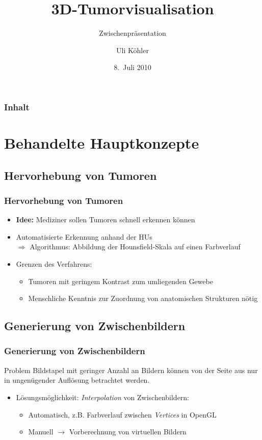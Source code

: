 \documentclass[14pt]{beamer}
\title{3D-Tumorvisualisation}
\subtitle{Zwischenpräsentation}
\author{Uli Köhler}
\institute[EMG]{Ernst-Mach-Gymnasium Haar}
\date{8.~Juli 2010}
\begin{document}


\frame{\titlepage}
\begin{frame}
\frametitle{Inhalt}
\tableofcontents
\end{frame}
\section{Behandelte Hauptkonzepte}
\subsection{Hervorhebung von Tumoren}
\begin{frame}[allowframebreaks]
 \frametitle{Hervorhebung von Tumoren}
    \begin{itemize}
     \item \textbf{Idee:} Mediziner sollen Tumoren schnell erkennen können
     \item Automatisierte Erkennung anhand der HUs\\
	  $\Rightarrow$ Algorithmus: Abbildung der Hounsfield-Skala auf einen Farbverlauf
     \item Grenzen des Verfahrens:
      \begin{itemize}
	\item Tumoren mit geringem Kontrast zum umliegenden Gewebe
	\item Menschliche Kenntnis zur Zuordnung von anatomischen Strukturen nötig
      \end{itemize}
    \end{itemize}
\end{frame}
\subsection{Generierung von Zwischenbildern}
\begin{frame}[allowframebreaks]
 \frametitle{Generierung von Zwischenbildern}
      \begin{block}{Problem}
	      Bildstapel mit geringer Anzahl an Bildern können von der Seite aus nur in ungenügender
	      Auflösung betrachtet werden.
      \end{block}
    \begin{itemize}
     \item Lösungsmöglichkeit: \textit{Interpolation} von Zwischenbildern:
      \begin{itemize}
	\item Automatisch, z.B. Farbverlauf zwischen \textit{Vertices} in OpenGL
	\item Manuell $\rightarrow$ Vorberechnung von virtuellen Bildern
      \end{itemize}
    \end{itemize}
\end{frame}
\end{document}
